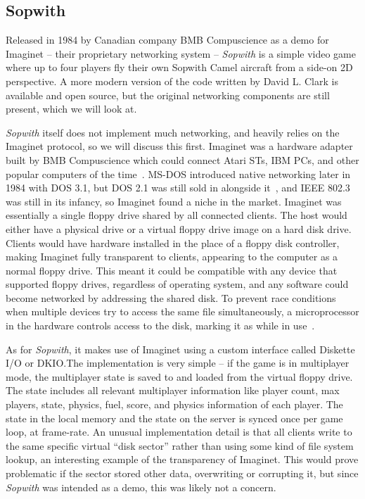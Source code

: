 \subsection{Sopwith}\label{subsec:sopwith}

Released in 1984 by Canadian company BMB Compuscience as a demo for Imaginet -- their proprietary networking system -- \textit{Sopwith} is a simple video game where up to four players fly their own Sopwith Camel aircraft from a side-on 2D perspective. A more modern version of the code written by David L. Clark is available and open source, but the original networking components are still present, which we will look at.

\textit{Sopwith} itself does not implement much networking, and heavily relies on the Imaginet protocol, so we will discuss this first. Imaginet was a hardware adapter built by BMB Compuscience which could connect Atari STs, IBM PCs, and other popular computers of the time~\cite{colead}. MS-DOS introduced native networking later in 1984 with DOS 3.1, but DOS 2.1 was still sold in alongside it~\cite{dosonline}, and IEEE 802.3 was still in its infancy, so Imaginet found a niche in the market. Imaginet was essentially a single floppy drive shared by all connected clients. The host would either have a physical drive or a virtual floppy drive image on a hard disk drive. Clients would have hardware installed in the place of a floppy disk controller, making Imaginet fully transparent to clients, appearing to the computer as a normal floppy drive. This meant it could be compatible with any device that supported floppy drives, regardless of operating system, and any software could become networked by addressing the shared disk. To prevent race conditions when multiple devices try to access the same file simultaneously, a microprocessor in the hardware controls access to the disk, marking it as  while in use~\cite{imaginetpatent}.

As for \textit{Sopwith}, it makes use of Imaginet using a custom interface called Diskette I/O or DKIO.\@ The implementation is very simple -- if the game is in multiplayer mode, the multiplayer state is saved to and loaded from the virtual floppy drive. The state includes all relevant multiplayer information like player count, max players, state, physics, fuel, score, and physics information of each player. The state in the local memory and the state on the server is synced once per game loop, \ie{} at frame-rate. An unusual implementation detail is that all clients write to the same specific virtual ``disk sector'' rather than using some kind of file system lookup, an interesting example of the transparency of Imaginet. This would prove problematic if the sector stored other data, overwriting or corrupting it, but since \textit{Sopwith} was intended as a demo, this was likely not a concern.

